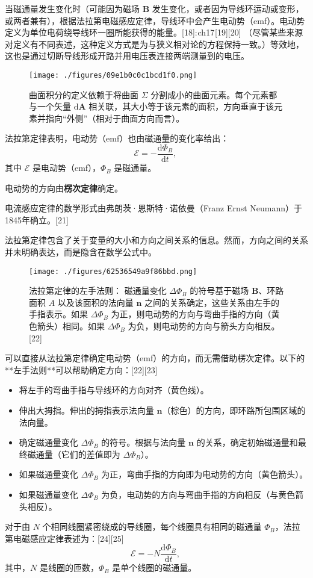 当磁通量发生变化时（可能因为磁场 \( \mathbf{B} \) 发生变化，或者因为导线环运动或变形，或两者兼有），根据法拉第电磁感应定律，导线环中会产生电动势（emf）。电动势定义为单位电荷绕导线环一圈所能获得的能量。[18]: ch17 [19][20] （尽管某些来源对定义有不同表述，这种定义方式是为与狭义相对论的方程保持一致。）等效地，这也是通过切断导线形成开路并用电压表连接两端测量到的电压。
\begin{figure}[ht]
\centering
\texttt{[image: ./figures/09e1b0c0c1bcd1f0.png]}
\caption{曲面积分的定义依赖于将曲面 \( \Sigma \) 分割成小的曲面元素。每个元素都与一个矢量 \( \mathrm{d}\mathbf{A} \) 相关联，其大小等于该元素的面积，方向垂直于该元素并指向“外侧”（相对于曲面方向而言）。} \label{fig_FLDL_5}
\end{figure}
法拉第定律表明，电动势（emf）也由磁通量的变化率给出：
\[
\mathcal{E} = -\frac{\mathrm{d} \Phi_B}{\mathrm{d} t},~
\]
其中 \( \mathcal{E} \) 是电动势（emf），\( \Phi_B \) 是磁通量。

电动势的方向由\textbf{楞次定律}确定。

电流感应定律的数学形式由弗朗茨·恩斯特·诺依曼（Franz Ernst Neumann）于1845年确立。[21]  

法拉第定律包含了关于变量的大小和方向之间关系的信息。然而，方向之间的关系并未明确表达，而是隐含在数学公式中。
\begin{figure}[ht]
\centering
\texttt{[image: ./figures/62536549a9f86bbd.png]}
\caption{法拉第定律的左手法则：   磁通量变化 \( \Delta \Phi_B \) 的符号基于磁场 \( \mathbf{B} \)、环路面积 \( A \) 以及该面积的法向量 \( \mathbf{n} \) 之间的关系确定，这些关系由左手的手指表示。如果 \( \Delta \Phi_B \) 为正，则电动势的方向与弯曲手指的方向（黄色箭头）相同。如果 \( \Delta \Phi_B \) 为负，则电动势的方向与箭头方向相反。[22]} \label{fig_FLDL_6}
\end{figure}

可以直接从法拉第定律确定电动势（emf）的方向，而无需借助楞次定律。以下的**左手法则**可以帮助确定方向：[22][23]  

\begin{itemize}
\item 将左手的弯曲手指与导线环的方向对齐（黄色线）。  
\item 伸出大拇指。伸出的拇指表示法向量 \( \mathbf{n} \)（棕色）的方向，即环路所包围区域的法向量。  
\item 确定磁通量变化 \( \Delta \Phi_B \) 的符号。根据与法向量 \( \mathbf{n} \) 的关系，确定初始磁通量和最终磁通量（它们的差值即为 \( \Delta \Phi_B \)）。  
\item 如果磁通量变化 \( \Delta \Phi_B \) 为正，弯曲手指的方向即为电动势的方向（黄色箭头）。  
\item 如果磁通量变化 \( \Delta \Phi_B \) 为负，电动势的方向与弯曲手指的方向相反（与黄色箭头相反）。
\end{itemize}
对于由 \( N \) 个相同线圈紧密绕成的导线圈，每个线圈具有相同的磁通量 \( \Phi_B \)，法拉第电磁感应定律表述为：[24][25]  
\[
\mathcal{E} = -N \frac{\mathrm{d} \Phi_B}{\mathrm{d} t},~
\]  
其中，\( N \) 是线圈的匝数，\( \Phi_B \) 是单个线圈的磁通量。
